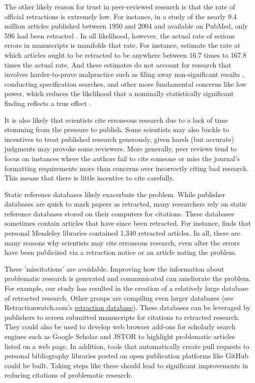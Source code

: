 \documentclass[12pt, letterpaper]{article}
\begin{document}
The other likely reason for trust in peer-reviewed research is that the rate of official retractions is extremely low. For instance, in a study of the nearly 9.4 million articles published between 1950 and 2004 and available on PubMed, only 596 had been retracted \citep{cokol2007many}. In all likelihood, however, the actual rate of serious errors in manuscripts is manifolds that rate. For instance, \citet{cokol2007many} estimate the rate at which articles ought to be retracted to be anywhere between 16.7 times to 167.8 times the actual rate. And these estimates do not account for research that involves harder-to-prove malpractice such as filing away non-significant results \citep{franco2014publication}, conducting specification searches, and other more fundamental concerns like low power, which reduces the likelihood that a nominally statistically significant finding reflects a true effect \citep{button2013power, ioannidis2005most}. 

It is also likely that scientists cite erroneous research due to a lack of time stemming from the pressure to publish. Some scientists may also buckle to incentives to treat published research generously, given harsh (but accurate) judgments may provoke some reviewers. More generally, peer reviews tend to focus on instances where the authors fail to cite someone or miss the journal's formatting requirements more than concerns over incorrectly citing bad research. This means that there is little incentive to cite carefully.

Static reference databases likely exacerbate the problem. While publisher databases are quick to mark papers as retracted, many researchers rely on static reference databases stored on their computers for citations. These databases sometimes contain articles that have since been retracted. For instance, \citet{davis2012persistence} finds that personal Mendeley libraries contained 1,340 retracted articles. In all, there are many reasons why scientists may cite erroneous research, even after the errors have been publicized via a retraction notice or an article noting the problem.

These 'miscitations' are avoidable. Improving how the information about problematic research is generated and communicated can ameliorate the problem. For example, our study has resulted in the creation of a relatively large database of retracted research. Other groups are compiling even larger databases (see Retractionwatch.com's \href{http://retractiondatabase.org/}{retraction database}). These databases can be leveraged by publishers to screen submitted manuscripts for citations to retracted research. They could also be used to develop web browser add-ons for scholarly search engines such as Google Scholar and JSTOR to highlight problematic articles listed on a web page. In addition, tools that automatically create pull requests to personal bibliography libraries posted on open publication platforms like GitHub could be built. Taking steps like these should lead to significant improvements in reducing citations of problematic research.
\end{document}
